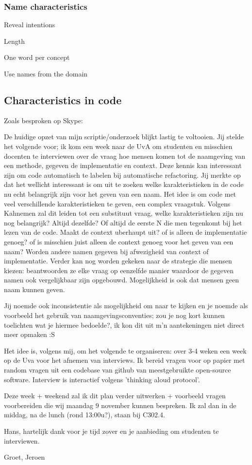 \subsubsection{Name characteristics}

\begin{list}{-}{Characteristics of names in programming:}
\item Reveal intentions
\item Length
\item One word per concept
\item Use names from the domain
\end{list}


\subsection{Characteristics in code}




Zoals besproken op Skype:

De huidige opzet van mijn scriptie/onderzoek blijkt lastig te voltooien. Jij stelde het volgende voor; ik kom een week naar de UvA om studenten en misschien docenten te interviewen over de vraag hoe mensen komen tot de naamgeving van een methode, gegeven de implementatie en context. Deze kennis kan interessant zijn om code automatisch te labelen bij automatische refactoring. Jij merkte op dat het wellicht interessant is om uit te zoeken welke karakteristieken in de code nu echt belangrijk zijn voor het geven van een naam. Het idee is om code met veel verschillende karakteristieken te geven, een complex vraagstuk. Volgens Kahnemen zal dit leiden tot een substituut vraag, welke karakteristieken zijn nu nog belangrijk? Altijd dezelfde? Of altijd de eerste N die men tegenkomt bij het lezen van de code. Maakt de context uberhaupt uit? of is alleen de implementatie genoeg? of is misschien juist alleen de context genoeg voor het geven van een naam? Worden andere namen gegeven bij afwezigheid van context of implementatie. Verder kan nog worden gekeken naar de strategie die mensen kiezen: beantwoorden ze elke vraag op eenzelfde manier waardoor de gegeven namen ook vergelijkbaar zijn opgebouwd. Mogelijkheid is ook dat mensen geen naam kunnen geven. 

Jij noemde ook inconsistentie als mogelijkheid om naar te kijken en je noemde als voorbeeld het gebruik van naamgevingsconventies; zou je nog kort kunnen toelichten wat je hiermee bedoelde?, ik kon dit uit m'n aantekeningen niet direct meer opmaken :S

Het idee is, volgens mij, om het volgende te organiseren: over 3-4 weken een week op de Uva voor het afnemen van interviews. Ik bereid vragen voor op papier met random vragen uit een codebase van github van meestgebruikte open-source software. Interview is interactief volgens 'thinking aloud protocol'.

Deze week + weekend zal ik dit plan verder uitwerken + voorbeeld vragen voorbereiden die wij maandag 9 november kunnen bespreken. Ik zal dan in de middag, na de lunch (rond 13:00u?), staan bij C302.4.

Hans, hartelijk dank voor je tijd zover en je aanbieding om studenten te interviewen.

Groet,
Jeroen